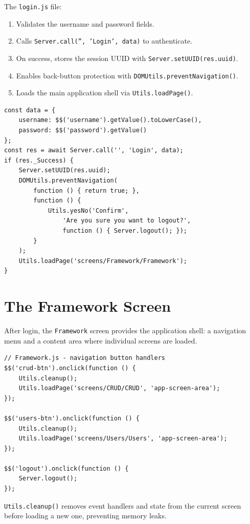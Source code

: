 The \texttt{login.js} file:
\begin{enumerate}
  \item Validates the username and password fields.
  \item Calls \texttt{Server.call('', 'Login', data)} to authenticate.
  \item On success, stores the session UUID with \texttt{Server.setUUID(res.uuid)}.
  \item Enables back-button protection with \texttt{DOMUtils.preventNavigation()}.
  \item Loads the main application shell via \texttt{Utils.loadPage()}.
\end{enumerate}

\begin{lstlisting}[style=javascript]
const data = {
    username: $$('username').getValue().toLowerCase(),
    password: $$('password').getValue()
};
const res = await Server.call('', 'Login', data);
if (res._Success) {
    Server.setUUID(res.uuid);
    DOMUtils.preventNavigation(
        function () { return true; },
        function () {
            Utils.yesNo('Confirm',
                'Are you sure you want to logout?',
                function () { Server.logout(); });
        }
    );
    Utils.loadPage('screens/Framework/Framework');
}
\end{lstlisting}

\section{The Framework Screen}
\label{sec:fe-framework}

After login, the \texttt{Framework} screen provides the application shell: a navigation menu and a content area where individual screens are loaded.

\begin{lstlisting}[style=javascript]
// Framework.js - navigation button handlers
$$('crud-btn').onclick(function () {
    Utils.cleanup();
    Utils.loadPage('screens/CRUD/CRUD', 'app-screen-area');
});

$$('users-btn').onclick(function () {
    Utils.cleanup();
    Utils.loadPage('screens/Users/Users', 'app-screen-area');
});

$$('logout').onclick(function () {
    Server.logout();
});
\end{lstlisting}

\noindent
\texttt{Utils.cleanup()} removes event handlers and state from the current screen before loading a new one, preventing memory leaks.

